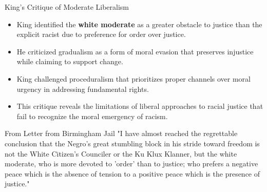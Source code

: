 \documentclass{beamer}
\begin{document}
	\begin{frame}{King's Critique of Moderate Liberalism}
		\begin{itemize}
			\item King identified the \textbf{white moderate} as a greater obstacle to justice than the explicit racist due to preference for order over justice.
			\item He criticized gradualism as a form of moral evasion that preserves injustice while claiming to support change.
			\item King challenged proceduralism that prioritizes proper channels over moral urgency in addressing fundamental rights.
			\item This critique reveals the limitations of liberal approaches to racial justice that fail to recognize the moral emergency of racism.
		\end{itemize}
		
		\begin{exampleblock}{From Letter from Birmingham Jail}
			"I have almost reached the regrettable conclusion that the Negro's great stumbling block in his stride toward freedom is not the White Citizen's Counciler or the Ku Klux Klanner, but the white moderate, who is more devoted to 'order' than to justice; who prefers a negative peace which is the absence of tension to a positive peace which is the presence of justice."
		\end{exampleblock}
	\end{frame}
	
\end{document}
